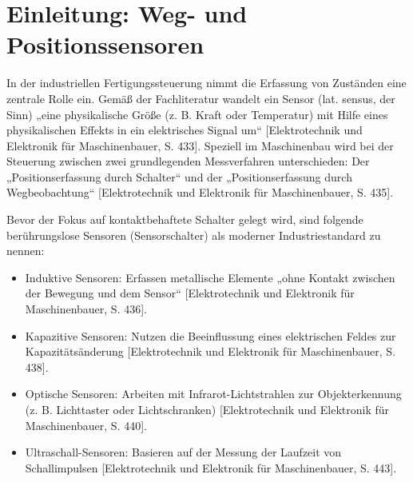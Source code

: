 \section{Einleitung: Weg- und Positionssensoren}

In der industriellen Fertigungssteuerung nimmt die Erfassung von Zuständen eine zentrale Rolle ein. Gemäß der Fachliteratur wandelt ein Sensor (lat. sensus, der Sinn) „eine physikalische Größe (z. B. Kraft oder Temperatur) mit Hilfe eines physikalischen Effekts in ein elektrisches Signal um“ [Elektrotechnik und Elektronik für Maschinenbauer, S. 433]. Speziell im Maschinenbau wird bei der Steuerung zwischen zwei grundlegenden Messverfahren unterschieden: Der „Positionserfassung durch Schalter“ und der „Positionserfassung durch Wegbeobachtung“ [Elektrotechnik und Elektronik für Maschinenbauer, S. 435].

Bevor der Fokus auf kontaktbehaftete Schalter gelegt wird, sind folgende berührungslose Sensoren (Sensorschalter) als moderner Industriestandard zu nennen:

\begin{itemize}
	\item Induktive Sensoren: Erfassen metallische Elemente „ohne Kontakt zwischen der Bewegung und dem Sensor“ [Elektrotechnik und Elektronik für Maschinenbauer, S. 436].
	\item Kapazitive Sensoren: Nutzen die Beeinflussung eines elektrischen Feldes zur Kapazitätsänderung [Elektrotechnik und Elektronik für Maschinenbauer, S. 438].
	\item Optische Sensoren: Arbeiten mit Infrarot-Lichtstrahlen zur Objekterkennung (z. B. Lichttaster oder Lichtschranken) [Elektrotechnik und Elektronik für Maschinenbauer, S. 440].
	\item Ultraschall-Sensoren: Basieren auf der Messung der Laufzeit von Schallimpulsen [Elektrotechnik und Elektronik für Maschinenbauer, S. 443].
\end{itemize}
